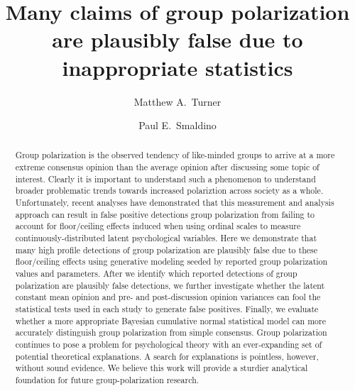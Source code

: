 \documentclass[11pt, letterpaper]{article}
\begin{document}
\title{Many claims of group polarization are plausibly false due to inappropriate
    statistics}
\author[1,2]{{Matthew A.~Turner}}

\author[3,4,5]{{Paul E.~Smaldino}}



\maketitle


\linenumbers
\modulolinenumbers[5]

\begin{abstract}
  \noindent
  Group polarization is the observed tendency of
  like-minded groups to arrive at a more extreme consensus opinion than
  the average opinion after discussing some topic of interest.
  Clearly it is important to understand such a phenomenon to understand broader
  problematic trends towards increased polariztion across society as a whole.
  Unfortunately, recent analyses have demonstrated that this measurement and
  analysis approach can result in false positive detections group polarization
  from failing to account for floor/ceiling effects induced when using ordinal scales to
  measure continuously-distributed latent psychological variables. 
  Here we demonstrate that many high profile detections
  of group polarization are plausibly false
  due to these floor/ceiling effects using generative modeling seeded by 
  reported group polarization values and parameters. After we identify which
  reported detections of group polarization are plausibly false detections, we further
  investigate whether the latent constant mean opinion and pre- and post-discussion
  opinion variances can fool the statistical tests used in each study to 
  generate false positives. Finally, we evaluate whether a more appropriate
  Bayesian cumulative normal statistical model can more accurately distinguish
  group polarization from simple consensus. Group polarization continues to 
  pose a problem for psychological theory with an ever-expanding set of potential theoretical
  explanations. A search for explanations is pointless, however, without sound
  evidence. We believe this work will provide a sturdier analytical foundation for 
  future group-polarization research.
\end{abstract}
\clearpage
\end{document}
